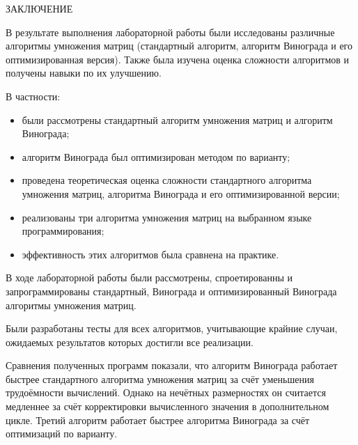 \begin{center}
    \MakeUppercase{\large Заключение}
\end{center}

В результате выполнения лабораторной работы были исследованы различные алгоритмы умножения матриц (стандартный алгоритм, алгоритм Винограда и его оптимизированная версия). Также была изучена оценка сложности алгоритмов и получены навыки по их улучшению.

\vspace{0.25cm}
В частности:

\begin{itemize}

\item были рассмотрены стандартный алгоритм умножения матриц и алгоритм Винограда;

\item алгоритм Винограда был оптимизирован методом по варианту;

\item проведена теоретическая оценка сложности стандартного алгоритма умножения матриц, алгоритма Винограда и его оптимизированной версии;

\item реализованы три алгоритма умножения матриц на выбранном языке программирования;

\item эффективность этих алгоритмов была сравнена на практике.

\end{itemize}

В ходе лабораторной работы были рассмотрены, спроетированны и запрограммированы стандартный, Винограда и оптимизированный Винограда алгоритмы умножения матриц.

Были разработаны тесты для всех алгоритмов, учитывающие крайние случаи, ожидаемых результатов которых достигли все реализации.

Сравнения полученных программ показали, что алгоритм Винограда работает быстрее стандартного алгоритма умножения матриц за счёт уменьшения трудоёмности вычислений. Однако на нечётных размерностях он считается медленнее за счёт корректировки вычисленного значения в дополнительном цикле. Третий алгоритм работает быстрее алгоритма Винограда за счёт оптимизаций по варианту.

\newpage